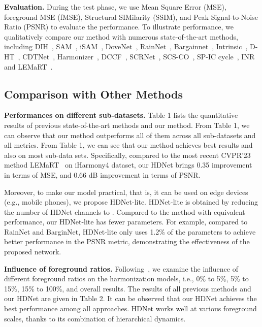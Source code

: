 \documentclass[sigconf]{acmart}
\begin{document}
\noindent
\textbf{Evaluation.} During the test phase, we use Mean Square Error (MSE), foreground MSE (fMSE), Structural SIMilarity (SSIM), and Peak Signal-to-Noise Ratio (PSNR) to evaluate the performance. To illustrate performance, we qualitatively compare our method with numerous state-of-the-art methods, including DIH~\cite{DIH}, SAM~\cite{SSAM}, iSAM~\cite{sofiiuk2021foreground}, DoveNet~\cite{DoveNet}, RainNet~\cite{RAIN}, Bargainnet~\cite{Bargainnet}, Intrinsic~\cite{GuoZJGZ21}, D-HT~\cite{IHT}, CDTNet~\cite{CDTNet}, Harmonizer~\cite{Harmonizer}, DCCF~\cite{DCCF}, SCRNet~\cite{liang2021spatial}, SCS-CO~\cite{hang2022scs}, SP-IC cycle~\cite{cai2023structure}, INR\cite{inr} and LEMaRT~\cite{liu2023lemart}. 

\subsection{Comparison with Other Methods}



\noindent
\textbf{Performances on different sub-datasets.} Table 1 lists the quantitative results of previous state-of-the-art methods and our method. From Table 1, we can observe that our method outperforms all of them across all sub-datasets and all metrics. From Table 1, we can see that our method achieves best results and also on most sub-data sets. Specifically, compared to the most recent CVPR'23 method LEMaRT~\cite{liu2023lemart} on iHarmony4 dataset, our HDNet brings 0.35 improvement in terms of MSE, and 0.66 dB improvement in terms of PSNR. 

Moreover, to make our model practical, that is, it can be used on edge devices (e.g., mobile phones), we propose HDNet-lite. HDNet-lite is obtained by reducing the number of HDNet channels to . Compared to the method with equivalent performance, our HDNet-lite has fewer parameters. For example, compared to RainNet and BarginNet, HDNet-lite only uses 1.2\% of the parameters to achieve better performance in the PSNR metric, demonstrating the effectiveness of the proposed network.

\noindent
\textbf{Influence of foreground ratios.} Following~\cite{RAIN}, we examine the influence of different foreground ratios on the harmonization models, i.e., 0\% to 5\%, 5\% to 15\%, 15\% to 100\%, and overall results. The results of all previous methods and our HDNet are given in Table 2. It can be observed that our HDNet achieves the best performance among all approaches. HDNet works well at various foreground scales, thanks to its combination of hierarchical dynamics.
\end{document}
